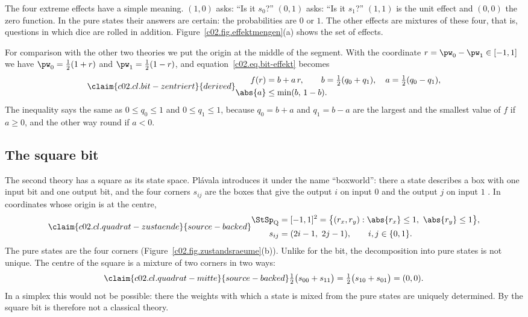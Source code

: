 The four extreme effects have a simple meaning. $(1,0)$ asks: “Is it $s_0$?” $(0,1)$
asks: “Is it $s_1$?” $(1,1)$ is the unit effect and $(0,0)$ the zero function. In the pure
states their answers are certain: the probabilities are $0$ or $1$. The other effects are
mixtures of these four, that is, questions in which dice are rolled in addition.
Figure~\ref{c02.fig.effektmengen}(a) shows the set of effects.

For comparison with the other two theories we put the origin at the middle of the segment.
With the coordinate $r = \pw_0 - \pw_1 \in [-1,1]$ we have $\pw_0 = \tfrac12(1+r)$ and
$\pw_1 = \tfrac12(1-r)$, and equation~\eqref{c02.eq.bit-effekt} becomes
\begin{equation}\label{c02.eq.bit-zentriert}\claim{c02.cl.bit-zentriert}{derived}
  \begin{aligned}
    f(r) &= b + a\, r, \qquad b = \tfrac12(q_0 + q_1), \quad a = \tfrac12(q_0 - q_1), \\
    \abs{a} &\leq \min(b,\, 1-b) .
  \end{aligned}
\end{equation}
The inequality says the same as $0 \leq q_0 \leq 1$ and $0 \leq q_1 \leq 1$, because
$q_0 = b + a$ and $q_1 = b - a$ are the largest and the smallest value of $f$ if
$a \geq 0$, and the other way round if $a < 0$.

\subsection{The square bit}\label{c02.s4.2}

The second theory has a square as its state space. Plávala introduces it under the name
“boxworld”: there a state describes a box with one input bit and one output bit, and the
four corners $s_{ij}$ are the boxes that give the output $i$ on input $0$ and the output
$j$ on input $1$
. In coordinates whose origin is
at the centre,
\begin{equation}\label{c02.eq.quadrat}\claim{c02.cl.quadrat-zustaende}{source-backed}
  \begin{aligned}
    \StSp_{\mathrm{Q}} &= [-1,1]^2 = \bigl\{ (r_x, r_y) : \abs{r_x} \leq 1,\ \abs{r_y} \leq 1 \bigr\}, \\
    s_{ij} &= (2i-1,\ 2j-1), \qquad i, j \in \{0,1\} .
  \end{aligned}
\end{equation}
The pure states are the four corners (Figure~\ref{c02.fig.zustandsraeume}(b)). Unlike for
the bit, the decomposition into pure states is not unique. The centre of the square is a
mixture of two corners in two ways:
\begin{equation}\label{c02.eq.quadrat-mitte}\claim{c02.cl.quadrat-mitte}{source-backed}
  \tfrac12\bigl(s_{00} + s_{11}\bigr) = \tfrac12\bigl(s_{10} + s_{01}\bigr) = (0,0) .
\end{equation}
In a simplex this would not be possible: there the weights with which a state is mixed
from the pure states are uniquely determined. By  the square bit is therefore
not a classical theory.

